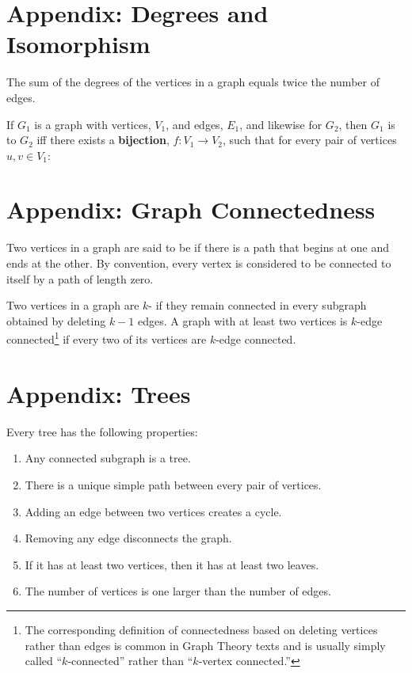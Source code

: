 \documentclass[handout]{mcs}
\begin{document}
\section*{Appendix: Degrees and Isomorphism}

The sum of the degrees of the vertices in a graph equals twice the number
of edges.

  If $G_1$ is a graph with vertices, $V_1$, and edges, $E_1$, and likewise
  for $G_2$, then $G_1$ is  to $G_2$ iff there exists a
  \textbf{bijection}, $f: V_1 \to V_2$, such that for every pair of
  vertices $u, v \in V_1$:

\section*{Appendix: Graph Connectedness}

  Two vertices in a graph are said to be  if there is a
  path that begins at one and ends at the other.  By convention, every
  vertex is considered to be connected to itself by a path of length zero.

  Two vertices in a graph are $k$- if they remain
  connected in every subgraph obtained by deleting $k-1$ edges.  A graph
  with at least two vertices is $k$-edge connected\footnote{The
    corresponding definition of connectedness based on deleting vertices
    rather than edges is common in Graph Theory texts and is usually
    simply called ``$k$-connected'' rather than ``$k$-vertex connected.''}
  if every two of its vertices are $k$-edge connected.

\section*{Appendix: Trees}

Every tree has the following properties:

\begin{enumerate}
\item Any connected subgraph is a tree.
\item There is a unique simple path between every pair of vertices.
\item Adding an edge between two vertices creates a cycle.
\item Removing any edge disconnects the graph.
\item If it has at least two vertices, then it has at least two leaves.
\item The number of vertices is one larger than the number of edges.
\end{enumerate}
\end{document}
